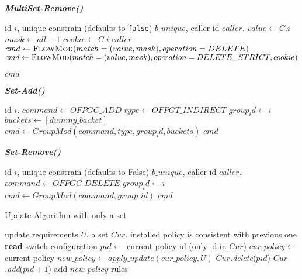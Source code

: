 \documentclass[conference]{sigcomm-alternate}
\begin{document}
\begin{algorithm}[t]
    \caption{\textbf{\emph{MultiSet-Remove()}}}
    \label{alg:template}
    \begin{algorithmic}[1]
    \Require id $i$, unique constrain (defaults to \texttt{false}) $b\_unique$, caller id $caller$.
    		\State $value \gets C.i$
    		\State $mask \gets all-1$
    		\State $cookie \gets C.i.caller$
    			\State $cmd\gets \textsc{FlowMod}(match=(value,mask), operation=DELETE) $
    		\Else
    		    \State $cmd\gets \textsc{FlowMod}(match=(value,mask), operation=DELETE\_STRICT, cookie) $
    		\EndIf
			
			\Return $cmd$
    \end{algorithmic}
\end{algorithm}


\begin{algorithm}[t]
    \caption{\textbf{\emph{Set-Add()}}}
    \label{alg:template}
    \begin{algorithmic}[1]
    \Require  id $i$.
    		\State $command \gets OFPGC\_ADD$
    		\State $type \gets OFPGT\_INDIRECT$
    		\State $group_id \gets i$
    		\State $buckets \gets [dummy\_backet]$
    		\State $cmd\gets GroupMod(command, type, group_id, buckets) $
			\Return $cmd$
    \end{algorithmic}
\end{algorithm}

\begin{algorithm}[t]
    \caption{\textbf{\emph{Set-Remove()}}}
    \label{alg:template}
    \begin{algorithmic}[1]
    \Require id $i$, unique constrain (defaults to False) $b\_unique$, caller id $caller$.
    		\State $command \gets OFPGC\_DELETE$
    		\State $group_id \gets i$
    		\State $cmd\gets GroupMod(command, group\_id) $
			\Return $cmd$
    \end{algorithmic}
\end{algorithm}


\begin{algorithm}[t]
    \caption{Update Algorithm with only a set}
    \label{alg:template}
    \begin{algorithmic}[1]
    \Require update requirements $U$, a set $Cur$.
    \Ensure installed policy is consistent with previous one
 		\Repeat
 			\State \textbf{read} switch configuration
 			\State $pid\gets$ current policy id (only id in $Cur$)
 			\State $cur\_policy\gets$ current policy
 			\State $new\_policy\gets apply\_update(cur\_policy,U)$
 			\startTransaction
	 			\State $Cur$\emph{.delete}($pid$)
	 			\State $Cur$\emph{.add}($pid+1$)
	 			\State add $new\_policy$ rules %
 			\endTransaction
			\Return

    \end{algorithmic}
\end{algorithm}
\end{document}
